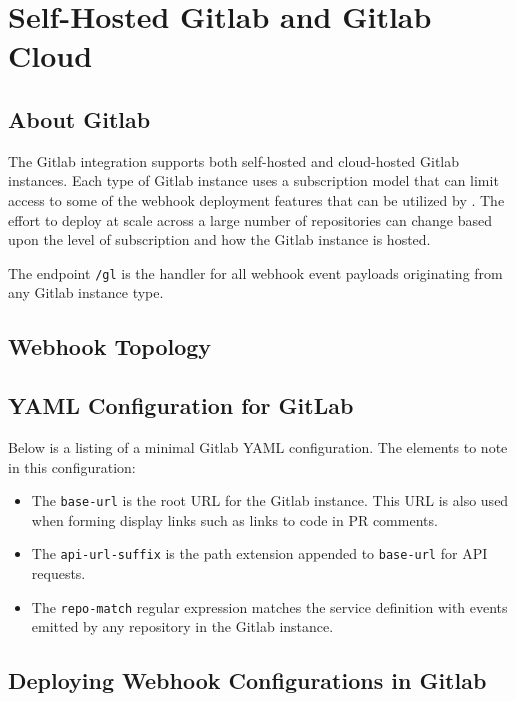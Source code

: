 \chapter{Self-Hosted Gitlab and Gitlab Cloud}


\section{About Gitlab}

The Gitlab integration supports both self-hosted and cloud-hosted Gitlab instances.  Each type
of Gitlab instance uses a subscription model that can limit access to some of the webhook
deployment features that can be utilized by \cxoneflowns. The effort to deploy \cxoneflow at scale
across a large number of repositories can change based upon the level of subscription
and how the Gitlab instance is hosted.

The \cxoneflow endpoint \texttt{/gl} is the handler for all webhook event
payloads originating from any Gitlab instance type.  


\section{Webhook Topology}




\section{\cxoneflowtext\space YAML Configuration for GitLab}

Below is a listing of a minimal Gitlab YAML configuration.  The elements to note in this
configuration:

\begin{itemize}
    \item The \texttt{base-url} is the root URL for the Gitlab instance.  This URL is also used
    when forming display links such as links to code in PR comments.
    \item The \texttt{api-url-suffix} is the path extension appended to \texttt{base-url} for API requests.
    \item The \texttt{repo-match} regular expression matches the service definition with events emitted by any repository
    in the Gitlab instance.
\end{itemize}



\section{Deploying Webhook Configurations in Gitlab}

